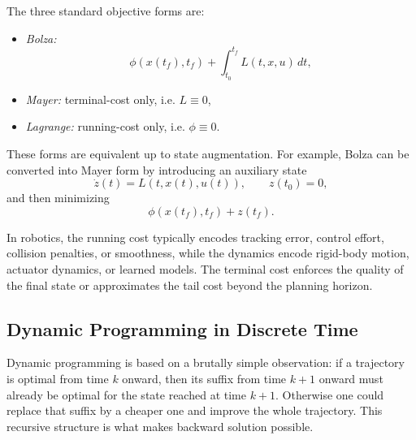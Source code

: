 \begin{notation}
	The three standard objective forms are:
	\begin{itemize}
		\item \emph{Bolza:}
		      \[
			      \phi(x(t_f),t_f)+\int_{t_0}^{t_f}L(t,x,u)\,dt,
		      \]
		\item \emph{Mayer:}
		      terminal-cost only, i.e. $L \equiv 0$,
		\item \emph{Lagrange:}
		      running-cost only, i.e. $\phi \equiv 0$.
	\end{itemize}
	These forms are equivalent up to state augmentation. For example, Bolza can be converted into Mayer form by introducing an auxiliary state
	\[
		\dot z(t)=L(t,x(t),u(t)),
		\qquad
		z(t_0)=0,
	\]
	and then minimizing
	\[
		\phi(x(t_f),t_f)+z(t_f).
	\]
\end{notation}

\begin{remark}
	In robotics, the running cost typically encodes tracking error, control effort, collision penalties, or smoothness, while the dynamics encode rigid-body motion, actuator dynamics, or learned models. The terminal cost enforces the quality of the final state or approximates the tail cost beyond the planning horizon.
\end{remark}

\subsection{Dynamic Programming in Discrete Time}
\label{sec:l4-dynamic-programming-in-discrete-time}

\begin{intuition}
	Dynamic programming is based on a brutally simple observation: if a trajectory is optimal from time $k$ onward, then its suffix from time $k+1$ onward must already be optimal for the state reached at time $k+1$. Otherwise one could replace that suffix by a cheaper one and improve the whole trajectory. This recursive structure is what makes backward solution possible.
\end{intuition}

